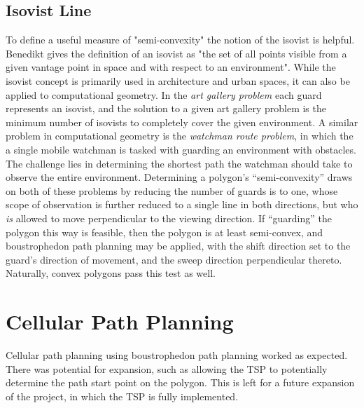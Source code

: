 \subsection{Isovist Line}
To define a useful measure of "semi-convexity" the notion of the isovist is helpful.
Benedikt gives the definition of an isovist as "the set of all points visible from a given vantage point in space and with respect to an environment"\cite{Isovists}.
While the isovist concept is primarily used in architecture and urban spaces, it can also be applied to computational geometry.
In the \textit{art gallery problem} each guard represents an isovist, and the solution to a given art gallery problem is the minimum number of isovists to completely cover the given environment.
A similar problem in computational geometry is the \textit{watchman route problem}, in which the a single mobile watchman is tasked with guarding an environment with obstacles.
The challenge lies in determining the shortest path the watchman should take to observe the entire environment.
Determining a polygon's ``semi-convexity'' draws on both of these problems by reducing the number of guards is to one, whose scope of observation is further reduced to a single line in both directions, but who \textit{is} allowed to move perpendicular to the viewing direction.
If ``guarding'' the polygon this way is feasible, then the polygon is at least semi-convex, and boustrophedon path planning may be applied, with the shift direction set to the guard's direction of movement, and the sweep direction perpendicular thereto.
Naturally, convex polygons pass this test as well.

\section{Cellular Path Planning}
Cellular path planning using boustrophedon path planning worked as expected.
There was potential for expansion, such as allowing the TSP to potentially determine the path start point on the polygon.
This is left for a future expansion of the project, in which the TSP is fully implemented.

